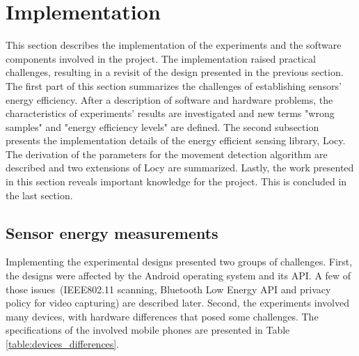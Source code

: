 \section{Implementation}
\label{s:implementation}
\hspace{10pt} This section describes the implementation of the experiments and the software components involved in the project. The implementation raised practical challenges, resulting in a revisit of the design presented in the previous section. The first part of this section summarizes the challenges of establishing sensors' energy efficiency. After a description of software and hardware problems, the characteristics of experiments' results are investigated and new terms "wrong samples" and "energy efficiency levels" are defined. The second subsection presents the implementation details of the energy efficient sensing library, Locy. The derivation of the parameters for the movement detection algorithm are described and two extensions of Locy are summarized. Lastly, the work presented in this section reveals important knowledge for the project. This is concluded in the last section.

\subsection{Sensor energy measurements}
Implementing the experimental designs presented two groups of challenges. First, the designs were affected by the Android operating system and its API. A few of those issues\ (IEEE802.11 scanning, Bluetooth Low Energy API and privacy policy for video capturing) are described later. Second, the experiments involved many devices, with hardware differences that posed some challenges. The specifications of the involved mobile phones are presented in Table \ref{table:devices_differences}.
	
